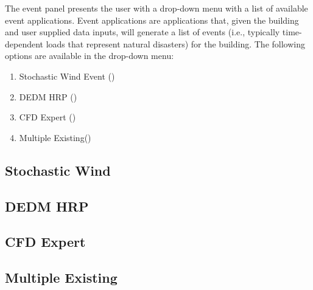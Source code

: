 The event panel presents the user with a drop-down menu with a list of
available event applications. Event applications are applications
that, given the building and user supplied data inputs, will generate
a list of events (i.e., typically time-dependent loads that represent natural disasters) for the building. The following options
are available in the drop-down menu:

\begin{enumerate}
\item Stochastic Wind Event ()
\item DEDM HRP ()
\item CFD Expert ()
\item Multiple Existing()
\end{enumerate}

\subsection{Stochastic Wind}
\label{subsec:stochastic_wind}


\subsection{DEDM HRP}
\label{subsec:dedm_hrp}



\subsection{CFD Expert}
\label{subsec:cfd_expert}


\subsection{Multiple Existing}
\label{subsec:multiple_existing}

